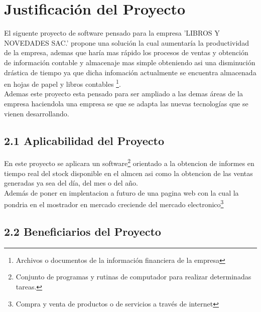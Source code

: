 \documentclass[12pt,a4paper]{article}
\begin{document}
\newpage


\section{Justificaci\'on del Proyecto}\label{sec:lit-rev}
El siguente proyecto de software pensado para la empresa 'LIBROS Y NOVEDADES SAC.' propone una soluci\'on la cual aumentar\'ia la productividad de la empresa, ademas que har\'ia mas r\'apido los procesos de ventas y obtenci\'on de informaci\'on contable y almacenaje mas simple obteniendo asi una disminuci\'on dr\'astica de tiempo ya que dicha infomaci\'on actualmente se encuentra almacenada en hojas de papel y libros contables \footnote[1]{Archivos o documentos de la información financiera de la empresa}.\\
Ademas este proyecto esta pensado para ser ampliado a las demas \'areas de la empresa haciendola una empresa se que se adapta las nuevas tecnolog\'ias que se vienen desarrollando.

\begin{flushright}
\section*{2.1 Aplicabilidad del Proyecto}
\end{flushright}
\begin{justify}

En este proyecto se aplicara un software\footnote[2]{Conjunto de programas y rutinas de computador para realizar determinadas tareas.} orientado a la obtencion de informes en tiempo real del stock disponible en el almcen asi como la obtencion de las ventas generadas ya sea del d\'ia, del mes o del a\~no.\\ Adem\'as de poner en implentacion a futuro de una pagina web con la cual la pondria en el mostrador en mercado creciende del mercado electronico\footnote[3]{Compra y venta de productos o de servicios a través de internet} 
\end{justify}


\begin{flushright}
\section*{2.2 Beneficiarios del Proyecto}
\end{flushright}
\newpage
\end{document}
